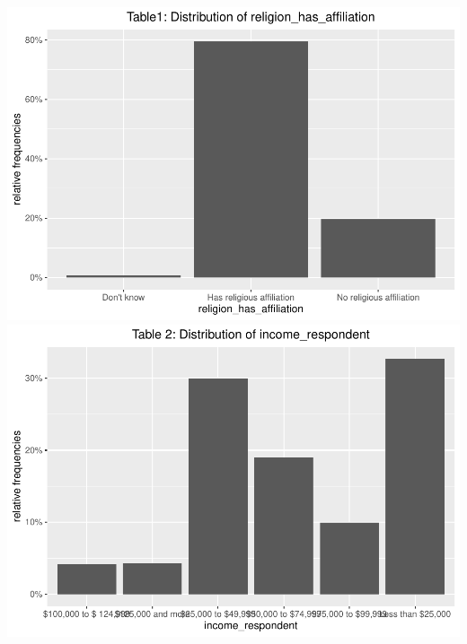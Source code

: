 \documentclass[]{article}
\begin{document}
\includegraphics{ProblemSet2-template_files/figure-latex/unnamed-chunk-3-4.pdf}
\includegraphics{ProblemSet2-template_files/figure-latex/unnamed-chunk-3-5.pdf}
\end{document}
